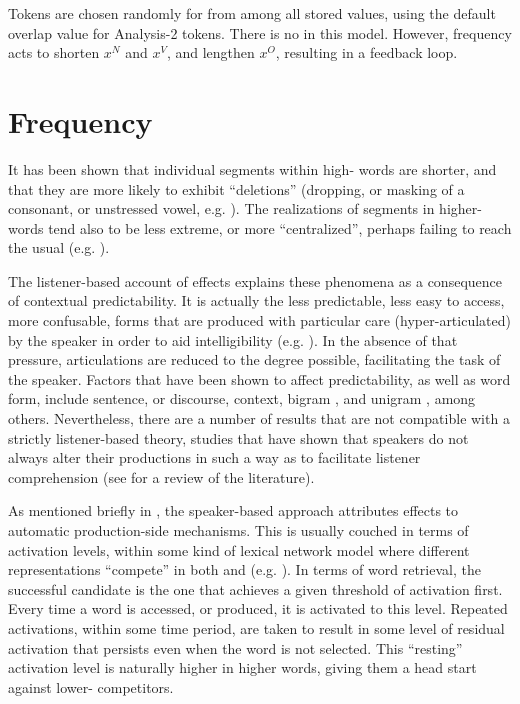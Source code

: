 Tokens are chosen randomly for  from among all stored values, using the default overlap value for Analysis-2
tokens. There is no   in this
model. However, frequency acts to shorten $x^{N}$ and $x^{V}$, and lengthen $x^{O}$, resulting in a feedback loop. 

\section{Frequency}\largerpage[1.75]

It has been shown that individual segments within high-
words are shorter, and that they are more likely to exhibit “deletions”
(dropping, or masking of a consonant, or unstressed vowel, e.g.
\citealt{Bell2003,Raymond2006,Bybee2008}). The realizations of segments
in higher- words tend also to be less extreme, or more “centralized”,
perhaps failing to reach the usual   (e.g. 
\citealt{munson2004effect,Scarborough2004,gahl2008time}).

The listener-based account of  effects explains these phenomena
as a consequence of contextual predictability. It is actually the
less predictable, less easy to access, more confusable, forms that
are produced with particular care (hyper-articulated) by the speaker
in order to aid intelligibility (e.g. \citealt{Aylett2004}). In
the absence of that pressure, articulations are reduced to the degree
possible, facilitating the task of the speaker. Factors that have
been shown to affect predictability, as well as word form, include
sentence, or discourse, context, bigram , and unigram ,
among others. Nevertheless, there are a number of results that are
not compatible with a strictly listener-based theory, studies that
have shown that speakers do not always alter their productions in
such a way as to facilitate listener comprehension (see \citealt{turnbull2015assessing}
for a review of the literature).

As mentioned briefly in , the
speaker-based approach attributes  effects to automatic production-side
mechanisms. This is usually couched in terms of activation levels,
within some kind of lexical network model where different representations
“compete” in both  and  (e.g. \citealp{mcclelland1981interactive,Dell1986}).
In terms of word retrieval, the successful candidate is the one that
achieves a given threshold of activation first. Every time a word
is accessed, or produced, it is activated to this level. Repeated
activations, within some time period, are taken to result in some
level of residual activation that persists even when the word is not
selected. This “resting” activation level is naturally higher
in higher  words, giving them a head start against lower-
competitors. 

